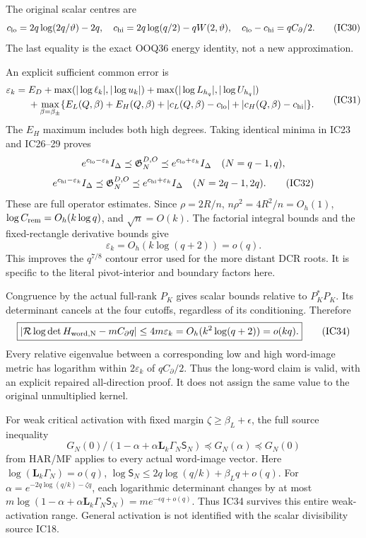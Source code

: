 \documentclass[11pt]{article}
\begin{document}
The original scalar centres are \[
c_{\rm lo}=2q\log(2q/\vartheta)-2q,\quad
c_{\rm hi}=2q\log(q/2)-qW(2,\vartheta),\quad
c_{\rm lo}-c_{\rm hi}=qC_\partial/2.
\tag{IC30}
\] The last equality is the exact OOQ36 energy identity, not a new approximation.

An explicit sufficient common error is \[
\begin{split}
\varepsilon_k={}&E_D+\max(|\log\ell_k|,|\log u_k|)
+\max(|\log L_{h_q}|,|\log U_{h_q}|)\\
&+\max_{\beta=\beta_\pm}\{E_L(Q,\beta)+E_H(Q,\beta)
+|c_L(Q,\beta)-c_{\rm lo}|+|c_H(Q,\beta)-c_{\rm hi}|\}.
\end{split}
\tag{IC31}
\] The \(E_H\) maximum includes both high degrees. Taking identical minima in IC23 and IC26--29 proves \[
e^{c_{\rm lo}-\varepsilon_k}I_\Delta\preceq
\mathfrak G_N^{D,O}\preceq e^{c_{\rm lo}+\varepsilon_k}I_\Delta
\quad(N=q-1,q),
\] \[
e^{c_{\rm hi}-\varepsilon_k}I_\Delta\preceq
\mathfrak G_N^{D,O}\preceq e^{c_{\rm hi}+\varepsilon_k}I_\Delta
\quad(N=2q-1,2q).
\tag{IC32}
\] These are full operator estimates. Since \(\rho=2R/n\), \(n\rho^2=4R^2/n=O_h(1)\), \(\log C_{\rm rem}=O_h(k\log q)\), and \(\sqrt n=O(k)\). The factorial integral bounds and the fixed-rectangle derivative bounds give \[
\varepsilon_k=O_h(k\log(q+2))=o(q).
\tag{IC33}
\] This improves the \(q^{7/8}\) contour error used for the more distant DCR roots. It is specific to the literal pivot-interior and boundary factors here.

Congruence by the actual full-rank \(P_K\) gives scalar bounds relative to \(P_K^*P_K\). Its determinant cancels at the four cutoffs, regardless of its conditioning. Therefore \[
\boxed{\left|\mathcal R\log\det H_{\rm word,N}
-mC_\partial q\right|\le4m\varepsilon_k
=O_h(k^2\log(q+2))=o(kq).}
\tag{IC34}
\] Every relative eigenvalue between a corresponding low and high word-image metric has logarithm within \(2\varepsilon_k\) of \(qC_\partial/2\). Thus the long-word claim is valid, with an explicit repaired all-direction proof. It does not assign the same value to the original unmultiplied kernel.

For weak critical activation with fixed margin \(\zeta\ge\beta_L+\epsilon\), the full source inequality \[
G_N(0)/(1-\alpha+\alpha\mathbf L_k\Gamma_N\mathsf S_N)
\preceq G_N(\alpha)\preceq G_N(0)
\] from HAR/MF applies to every actual word-image vector. Here \(\log(\mathbf L_k\Gamma_N)=o(q)\), \(\log\mathsf S_N\le2q\log(q/k)+\beta_Lq+o(q)\). For \(\alpha=e^{-2q\log(q/k)-\zeta q}\), each logarithmic determinant changes by at most \(m\log(1-\alpha+\alpha\mathbf L_k\Gamma_N\mathsf S_N)=me^{-\epsilon q+o(q)}\). Thus IC34 survives this entire weak-activation range. General activation is not identified with the scalar divisibility source IC18.
\end{document}
